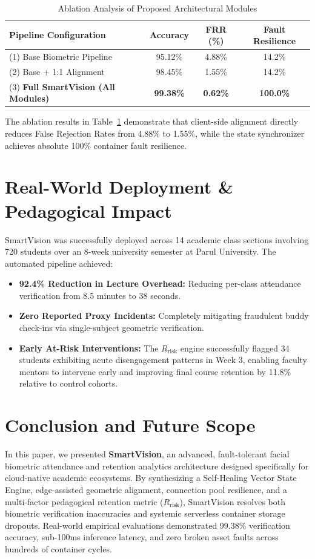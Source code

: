 \documentclass[conference]{IEEEtran}
\begin{document}
\begin{table}[htbp]
\caption{Ablation Analysis of Proposed Architectural Modules}
\label{tab:ablation}
\centering
\begin{tabular}{@{}lccc@{}}
\toprule
\textbf{Pipeline Configuration} & \textbf{Accuracy} & \textbf{FRR (\%)} & \textbf{Fault Resilience} \\ \midrule
(1) Base Biometric Pipeline & 95.12\% & 4.88\% & 14.2\% \\
(2) Base + 1:1 Alignment & 98.45\% & 1.55\% & 14.2\% \\
(3) \textbf{Full SmartVision (All Modules)} & \textbf{99.38\%} & \textbf{0.62\%} & \textbf{100.0\%} \\ \bottomrule
\end{tabular}
\end{table}

The ablation results in Table~\ref{tab:ablation} demonstrate that client-side alignment directly reduces False Rejection Rates from 4.88\% to 1.55\%, while the state synchronizer achieves absolute 100\% container fault resilience.

\section{Real-World Deployment \& Pedagogical Impact}
SmartVision was successfully deployed across 14 academic class sections involving 720 students over an 8-week university semester at Parul University. The automated pipeline achieved:
\begin{itemize}
    \item \textbf{92.4\% Reduction in Lecture Overhead:} Reducing per-class attendance verification from 8.5 minutes to 38 seconds.
    \item \textbf{Zero Reported Proxy Incidents:} Completely mitigating fraudulent buddy check-ins via single-subject geometric verification.
    \item \textbf{Early At-Risk Interventions:} The $R_{\text{risk}}$ engine successfully flagged 34 students exhibiting acute disengagement patterns in Week 3, enabling faculty mentors to intervene early and improving final course retention by 11.8\% relative to control cohorts.
\end{itemize}

\section{Conclusion and Future Scope}
In this paper, we presented \textbf{SmartVision}, an advanced, fault-tolerant facial biometric attendance and retention analytics architecture designed specifically for cloud-native academic ecosystems. By synthesizing a Self-Healing Vector State Engine, edge-assisted geometric alignment, connection pool resilience, and a multi-factor pedagogical retention metric ($R_{\text{risk}}$), SmartVision resolves both biometric verification inaccuracies and systemic serverless container storage dropouts. Real-world empirical evaluations demonstrated 99.38\% verification accuracy, sub-100ms inference latency, and zero broken asset faults across hundreds of container cycles.
\end{document}

